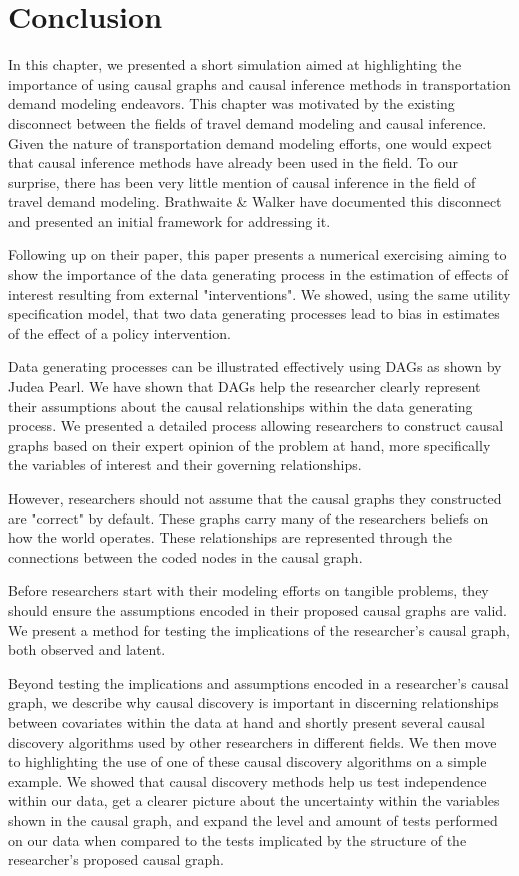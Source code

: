 \section{Conclusion}
\label{sec:conclusion}

In this chapter, we presented a short simulation aimed at highlighting the importance of using causal graphs and causal inference methods in transportation demand modeling endeavors.
This chapter was motivated by the existing disconnect between the fields of travel demand modeling
and causal inference.
Given the nature of transportation demand modeling efforts, one would expect that
causal inference methods have already been used in the field. To our surprise, there
has been very little mention of causal inference in the field of travel demand modeling.
Brathwaite & Walker \citet{brathwaite_2018_causal} have documented this disconnect and 
presented an initial framework for addressing it.

Following up on their paper, this paper presents a numerical exercising aiming to show
the importance of the data generating process in the estimation of effects of interest resulting from 
external "interventions". We showed, using the same utility specification model, that two data 
generating processes lead to bias in estimates of the effect of a policy intervention.

Data generating processes can be illustrated effectively using DAGs as shown by Judea Pearl.
We have shown that DAGs help the researcher clearly represent their assumptions about the
causal relationships within the data generating process. We presented a detailed process allowing researchers
to construct causal graphs based on their expert opinion of the problem at hand, more specifically
the variables of interest and their governing relationships. 

However, researchers should not assume that the causal graphs they constructed are "correct"
by default. These graphs carry many of the researchers beliefs on how the world operates.
These relationships are represented through the connections between the coded nodes in the causal graph.

Before researchers start with their modeling efforts on tangible problems, 
they should ensure the assumptions encoded in their proposed causal graphs are valid.
We present a method for testing the implications of the researcher's causal graph, both observed and latent.

Beyond testing the implications and assumptions encoded in a researcher's causal graph,
we describe why causal discovery is important in discerning relationships between covariates
within the data at hand and shortly present several causal discovery algorithms used by
other researchers in different fields. 
We then move to highlighting the use of one of these causal discovery algorithms on 
a simple example. We showed that causal discovery methods help us test independence within our data,
get a clearer picture about the uncertainty within the variables shown in the causal graph,
and expand the level and amount of tests performed on our data when compared to the tests
implicated by the structure of the researcher's proposed causal graph.

